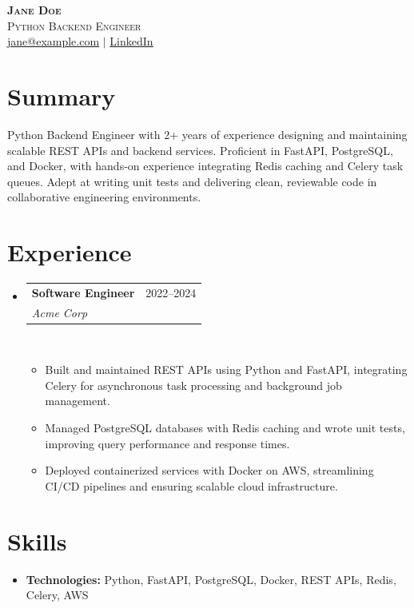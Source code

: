 \documentclass[letterpaper,11pt]{article}
\newcommand{\resumeItem}[1]{\item\small{{#1 \vspace{-3pt}}}}
\newcommand{\resumeSubheading}[4]{
  \vspace{-3pt}\item
    \begin{tabularx}{0.995\textwidth}[t]{Xr}
      \textbf{#1} & #2 \\
      \textit{\small#3} & \textit{\small #4} \\
    \end{tabularx}\\[-3pt]
    \vspace{3pt}
}
\newcommand{\resumeItemListStart}{\begin{itemize}}
\newcommand{\resumeItemListEnd}{\end{itemize}\vspace{-4pt}}
\newcommand{\resumeSubHeadingListStart}{
  \begin{itemize}[leftmargin=0.12in, label={}]
  \setlength{\itemsep}{0pt}
  \setlength{\parsep}{0pt}
  \setlength{\parskip}{0pt}
}
\newcommand{\resumeSubHeadingListEnd}{\end{itemize}}
\begin{document}
\begin{center}
    \textbf{\LARGE \scshape Jane Doe} \\ \vspace{1pt}
    \small \textsc{Python Backend Engineer} \\ \vspace{1pt}
    \small \href{mailto:jane@example.com}{\underline{jane@example.com}} $|$ \href{https://linkedin.com/in/janedoe}{\underline{LinkedIn}}
\end{center}

\vspace{-6pt}

\section{Summary}
\vspace{-4pt}
\small{Python Backend Engineer with 2+ years of experience designing and maintaining scalable REST APIs and backend services. Proficient in FastAPI, PostgreSQL, and Docker, with hands-on experience integrating Redis caching and Celery task queues. Adept at writing unit tests and delivering clean, reviewable code in collaborative engineering environments.}
\vspace{2pt}

\section{Experience}
\vspace{-4pt}
\resumeSubHeadingListStart
\resumeSubheading
{Software Engineer}{2022--2024}
{Acme Corp}{}
\resumeItemListStart
\resumeItem{Built and maintained REST APIs using Python and FastAPI, integrating Celery for asynchronous task processing and background job management.}
\resumeItem{Managed PostgreSQL databases with Redis caching and wrote unit tests, improving query performance and response times.}
\resumeItem{Deployed containerized services with Docker on AWS, streamlining CI/CD pipelines and ensuring scalable cloud infrastructure.}
\resumeItemListEnd
\resumeSubHeadingListEnd

\section{Skills}
\vspace{-4pt}
\begin{itemize}[leftmargin=0in, label={}, itemsep=1pt, topsep=2pt, parsep=0pt]
  \item \small{\textbf{Technologies:} Python, FastAPI, PostgreSQL, Docker, REST APIs, Redis, Celery, AWS}
\end{itemize}
\end{document}
